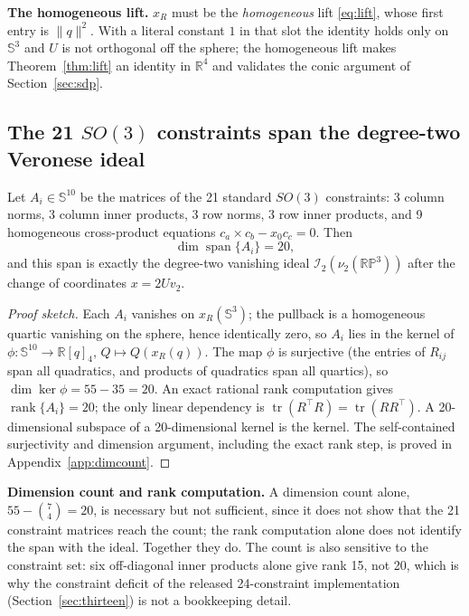 \textbf{The homogeneous lift.} $x_R$ must be the \emph{homogeneous} lift \eqref{eq:lift}, whose first entry is $\|q\|^2$. With a literal constant $1$ in that slot the identity holds only on $\mathbb{S}^3$ and $U$ is not orthogonal off the sphere; the homogeneous lift makes Theorem~\ref{thm:lift} an identity in $\mathbb{R}^4$ and validates the conic argument of Section~\ref{sec:sdp}.

\subsection{The 21 \texorpdfstring{$SO(3)$}{SO(3)} constraints span the degree-two Veronese ideal}\label{sec:ideal}

\begin{theorem}\label{thm:ideal}
Let $A_i\in\mathbb{S}^{10}$ be the matrices of the 21 standard $SO(3)$ constraints: 3 column norms, 3 column inner products, 3 row norms, 3 row inner products, and 9 homogeneous cross-product equations $c_a\times c_b-x_0c_c=0$. Then
\begin{equation}
\dim\operatorname{span}\{A_i\}=20,
\label{eq:span20}
\end{equation}
and this span is exactly the degree-two vanishing ideal $\mathcal{I}_2(\nu_2(\mathbb{RP}^3))$ after the change of coordinates $x=2Uv_2$.
\end{theorem}

\begin{proof}[Proof sketch]
Each $A_i$ vanishes on $x_R(\mathbb{S}^3)$; the pullback is a homogeneous quartic vanishing on the sphere, hence identically zero, so $A_i$ lies in the kernel of $\phi:\mathbb{S}^{10}\to\mathbb{R}[q]_4$, $Q\mapsto Q(x_R(q))$. The map $\phi$ is surjective (the entries of $R_{ij}$ span all quadratics, and products of quadratics span all quartics), so $\dim\ker\phi=55-35=20$. An exact rational rank computation gives $\operatorname{rank}\{A_i\}=20$; the only linear dependency is $\operatorname{tr}(R^\top R)=\operatorname{tr}(RR^\top)$. A 20-dimensional subspace of a 20-dimensional kernel is the kernel. The self-contained surjectivity and dimension argument, including the exact rank step, is proved in Appendix~\ref{app:dimcount}.
\end{proof}

\textbf{Dimension count and rank computation.} A dimension count alone, $55-\binom74=20$, is necessary but not sufficient, since it does not show that the 21 constraint matrices reach the count; the rank computation alone does not identify the span with the ideal. Together they do. The count is also sensitive to the constraint set: six off-diagonal inner products alone give rank 15, not 20, which is why the constraint deficit of the released 24-constraint implementation (Section~\ref{sec:thirteen}) is not a bookkeeping detail.

